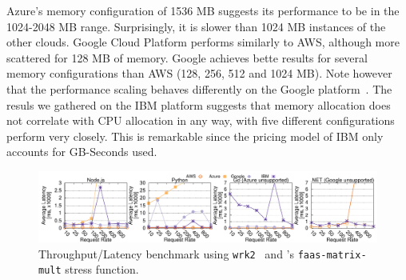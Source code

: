 Azure's memory configuration of 1536 \gls{MB} suggests its performance to be in the 1024-2048 \gls{MB} range.
Surprisingly, it is slower than 1024 \gls{MB} instances of the other clouds.  
Google Cloud Platform performs similarly to \gls{AWS}, although more scattered for 128 \gls{MB} of memory. 
Google achieves bette results for several memory configurations than \gls{AWS} (128, 256, 512 and 1024 \gls{MB}). %
Note however that the performance scaling behaves differently on the Google platform~\cite{GoogleFunctionsPricing}.
The resuls we gathered on the \gls{IBM} platform suggests that memory allocation does not correlate with \gls{CPU} allocation in any way, with five different configurations perform very closely. 
This is remarkable since the pricing model of \gls{IBM} only accounts for GB-Seconds used. 

\begin{figure}[!t]
\centering
\includegraphics[scale=0.7]{bilder/loadtest_average_latency/tputlat_combined.pdf}
\caption{Throughput/Latency benchmark using \texttt{wrk2}~\cite{wrk2} and \sys's  \texttt{faas-matrix-mult} stress function.
}
\label{fig:load_test_latency_all}
\end{figure}

